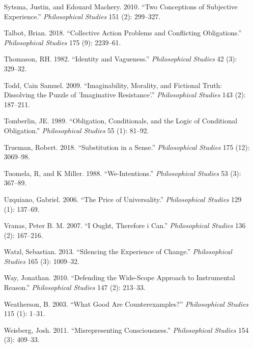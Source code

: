 \documentclass[
  10pt,
  letterpaper,
  DIV=11,
  numbers=noendperiod,
  twoside]{scrartcl}
\newlength{\cslhangindent}
\newenvironment{CSLReferences}[2] %
 {\begin{list}{}{%
  \setlength{\itemindent}{0pt}
  \setlength{\leftmargin}{0pt}
  \setlength{\parsep}{0pt}
  \ifodd #1
   \setlength{\leftmargin}{\cslhangindent}
   \setlength{\itemindent}{-1\cslhangindent}
  \fi
  \setlength{\itemsep}{#2\baselineskip}}}
 {\end{list}}
\begin{document}
\begin{CSLReferences}{1}{0}
Sytsma, Justin, and Edouard Machery. 2010. {``Two Conceptions of
Subjective Experience.''} \emph{Philosophical Studies} 151 (2):
299--327.

Talbot, Brian. 2018. {``Collective Action Problems and Conflicting
Obligations.''} \emph{Philosophical Studies} 175 (9): 2239--61.

Thomason, RH. 1982. {``Identity and Vagueness.''} \emph{Philosophical
Studies} 42 (3): 329--32.

Todd, Cain Samuel. 2009. {``Imaginability, Morality, and Fictional
Truth: Dissolving the Puzzle of 'Imaginative Resistance'.''}
\emph{Philosophical Studies} 143 (2): 187--211.

Tomberlin, JE. 1989. {``Obligation, Conditionals, and the Logic of
Conditional Obligation.''} \emph{Philosophical Studies} 55 (1): 81--92.

Trueman, Robert. 2018. {``Substitution in a Sense.''}
\emph{Philosophical Studies} 175 (12): 3069--98.

Tuomela, R, and K Miller. 1988. {``We-Intentions.''} \emph{Philosophical
Studies} 53 (3): 367--89.

Uzquiano, Gabriel. 2006. {``The Price of Universality.''}
\emph{Philosophical Studies} 129 (1): 137--69.

Vranas, Peter B. M. 2007. {``I Ought, Therefore i Can.''}
\emph{Philosophical Studies} 136 (2): 167--216.

Watzl, Sebastian. 2013. {``Silencing the Experience of Change.''}
\emph{Philosophical Studies} 165 (3): 1009--32.

Way, Jonathan. 2010. {``Defending the Wide-Scope Approach to
Instrumental Reason.''} \emph{Philosophical Studies} 147 (2): 213--33.

Weatherson, B. 2003. {``What Good Are Counterexamples?''}
\emph{Philosophical Studies} 115 (1): 1--31.

Weisberg, Josh. 2011. {``Misrepresenting Consciousness.''}
\emph{Philosophical Studies} 154 (3): 409--33.


\end{CSLReferences}
\end{document}
